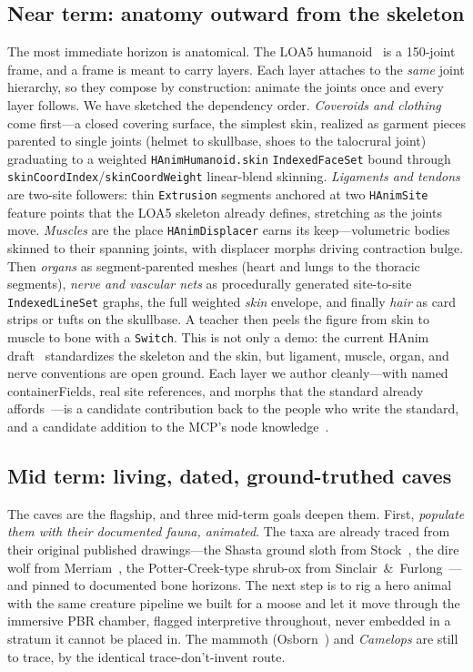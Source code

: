 \documentclass[11pt]{article}
\begin{document}
\subsection{Near term: anatomy outward from the skeleton}

The most immediate horizon is anatomical. The LOA5 humanoid~\cite{loa5draft,hanim} is a 150-joint frame, and a frame is meant to carry layers. Each layer attaches to the \emph{same} joint hierarchy, so they compose by construction: animate the joints once and every layer follows. We have sketched the dependency order. \emph{Coveroids and clothing} come first---a closed covering surface, the simplest skin, realized as garment pieces parented to single joints (helmet to skullbase, shoes to the talocrural joint) graduating to a weighted \texttt{HAnimHumanoid.skin} \texttt{IndexedFaceSet} bound through \texttt{skinCoordIndex}/\texttt{skinCoordWeight} linear-blend skinning. \emph{Ligaments and tendons} are two-site followers: thin \texttt{Extrusion} segments anchored at two \texttt{HAnimSite} feature points that the LOA5 skeleton already defines, stretching as the joints move. \emph{Muscles} are the place \texttt{HAnimDisplacer} earns its keep---volumetric bodies skinned to their spanning joints, with displacer morphs driving contraction bulge. Then \emph{organs} as segment-parented meshes (heart and lungs to the thoracic segments), \emph{nerve and vascular nets} as procedurally generated site-to-site \texttt{IndexedLineSet} graphs, the full weighted \emph{skin} envelope, and finally \emph{hair} as card strips or tufts on the skullbase. A teacher then peels the figure from skin to muscle to bone with a \texttt{Switch}. This is not only a demo: the current HAnim draft~\cite{hanim} standardizes the skeleton and the skin, but ligament, muscle, organ, and nerve conventions are open ground. Each layer we author cleanly---with named containerFields, real site references, and morphs that the standard already affords~\cite{x3d4}---is a candidate contribution back to the people who write the standard, and a candidate addition to the MCP's node knowledge~\cite{x3duom,allbones}.

\subsection{Mid term: living, dated, ground-truthed caves}

The caves are the flagship, and three mid-term goals deepen them. First, \emph{populate them with their documented fauna, animated}. The taxa are already traced from their original published drawings---the Shasta ground sloth from Stock~\cite{stock25}, the dire wolf from Merriam~\cite{merriam12}, the Potter-Creek-type shrub-ox from Sinclair~\&~Furlong~\cite{sf04}---and pinned to documented bone horizons. The next step is to rig a hero animal with the same creature pipeline we built for a moose and let it move through the immersive PBR chamber, flagged interpretive throughout, never embedded in a stratum it cannot be placed in. The mammoth (Osborn~\cite{osborn42}) and \emph{Camelops} are still to trace, by the identical trace-don't-invent route.
\end{document}
